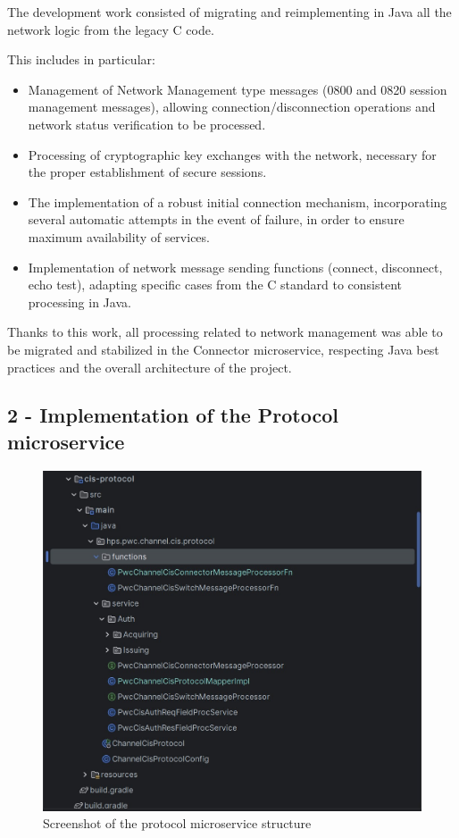 \documentclass[12pt,a4paper]{report}
\begin{document}
The development work consisted of migrating and reimplementing in Java
all the network logic from the legacy C code.

This includes in particular:

\begin{itemize}
\item
  Management of Network Management type messages (0800 and 0820 session
  management messages), allowing connection/disconnection operations and
  network status verification to be processed.
\item
  Processing of cryptographic key exchanges with the network, necessary
  for the proper establishment of secure sessions.
\item
  The implementation of a robust initial connection mechanism,
  incorporating several automatic attempts in the event of failure, in
  order to ensure maximum availability of services.
\item
  Implementation of network message sending functions (connect,
  disconnect, echo test), adapting specific cases from the C standard to
  consistent processing in Java.
\end{itemize}

Thanks to this work, all processing related to network management was
able to be migrated and stabilized in the Connector microservice,
respecting Java best practices and the overall architecture of the
project.


\subsection{2 - Implementation of the Protocol microservice}

\begin{figure}[H]
\centering
\includegraphics[width=\textwidth,height=\textheight,keepaspectratio]{media/image64.jpg}
\caption{Screenshot of the protocol microservice structure}
\label{fig:PMS}
\end{figure} 
\end{document}
